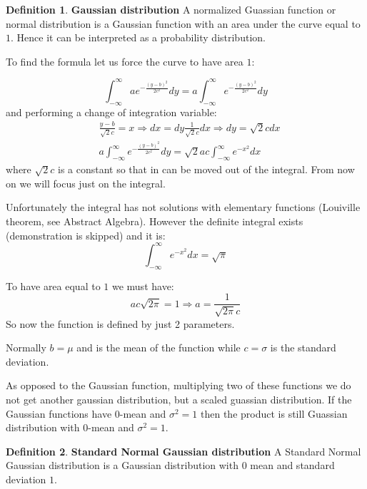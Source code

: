 \documentclass[12pt, letterpaper]{article}
\theoremstyle{definition}
\newtheorem{definition}{Definition}[section]
\begin{document}
\begin{definition}{\textbf{Gaussian distribution}}
A normalized Guassian function or normal distribution is a Gaussian function with an area under the curve equal to $1$. Hence it can be interpreted as a probability distribution.

To find the formula let us force the curve to have area $1$:

\begin{equation}
\int_{-\infty}^{\infty} a e^{-\frac{(y-b)^2}{2c^2}} dy = a \int_{-\infty}^{\infty} e^{-\frac{(y-b)^2}{2c^2}} dy
\end{equation}
and performing a change of integration variable:
\begin{equation}
\begin{aligned}
&\frac{y-b}{\sqrt{2}c} = x \Rightarrow dx = dy \frac{1}{\sqrt{2}c} dx \Rightarrow dy = \sqrt{2}c dx\\
&a \int_{-\infty}^{\infty} e^{-\frac{(y-b)^2}{2c^2}} dy = \sqrt{2}ac  \int_{-\infty}^{\infty} e^{-x^2} dx 
\end{aligned}
\end{equation}
where  $ \sqrt{2}c$ is a constant so that in can be moved out of the integral. From now on we will focus just on the integral.

Unfortunately the integral has not solutions with elementary functions (Louiville theorem, see Abstract Algebra). However the definite integral exists (demonstration is skipped) and it is:
\begin{equation}
\int_{-\infty}^{\infty} e^{-x^2} dx = \sqrt{\pi}
\end{equation}

To have area equal to $1$ we must have:
\begin{equation}
ac\sqrt{2\pi} = 1 \Rightarrow a =  \frac{1}{\sqrt{2\pi}c}
\end{equation}
So now the function is defined by just 2 parameters. 

Normally $b=\mu$ and is the mean of the function while $c=\sigma$ is the standard deviation.

As opposed to the Gaussian function, multiplying two of these functions we do not get another gaussian distribution, but a scaled guassian distribution. If the Gaussian functions have 0-mean and $\sigma^2=1$ then the product is still Guassian distribution with $0$-mean and $\sigma^2=1$.
\end{definition}

\begin{definition}{\textbf{Standard Normal Gaussian distribution}}
A Standard Normal Gaussian distribution is a Gaussian distribution with $0$ mean and standard deviation $1$.
\end{definition}
\end{document}

